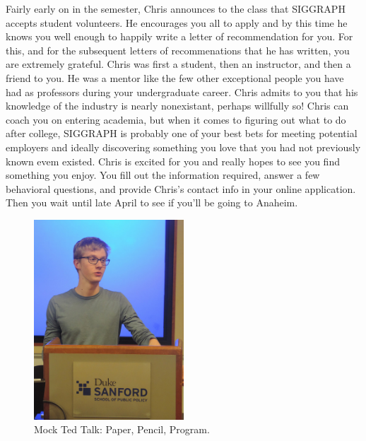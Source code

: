 \documentclass[a4paper, 11pt]{article} %
\begin{document}
Fairly early on in the semester, Chris announces to the class that SIGGRAPH accepts student volunteers. He encourages you all to apply and by this time he knows you well enough to happily write a letter of recommendation for you. For this, and for the subsequent letters of recommenations that he has written, you are extremely grateful. Chris was first a student, then an instructor, and then a friend to you. He was a mentor like the few other exceptional people you have had as professors during your undergraduate career. Chris admits to you that his knowledge of the industry is nearly nonexistant, perhaps willfully so! Chris can coach you on entering academia, but when it comes to figuring out what to do after college, SIGGRAPH is probably one of your best bets for meeting potential employers and ideally discovering something you love that you had not previously known evem existed. Chris is excited for you and really hopes to see you find something you enjoy. You fill out the information required, answer a few behavioral questions, and provide Chris's contact info in your online application. Then you wait until late April to see if you'll be going to Anaheim.

\begin{figure}[h!]
	\centering
	\includegraphics[width=0.5\textwidth]{ted_talk}
	\caption*{Mock Ted Talk: Paper, Pencil, Program.}
\end{figure}
\end{document}
